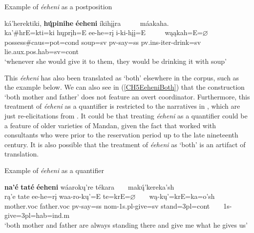 \begin{exe}
    \item\label{Ch5EeheniNoun} Example of \textit{éeheni} as a postposition

    \glll ká'herektiki, \textbf{hų́pinihe} \textbf{éeheni} íkihįįra ~ ~ ~ máakaha.\\
    ka'\#hrE=kti=ki hųprįh=E ee-he=rį i-ki-hįį=E ~ ~ ~ wąąkah=E=$\varnothing$\\
    \textnormal{possess}\#caus=pot=cond \textnormal{soup}=sv pv-\textnormal{say}=ss pv.ins-iter-\textnormal{drink}=sv ~ ~ ~ \textnormal{lie}.aux.pos.hab=sv=cont\\
    \glt `whenever she would give it to them, they would be drinking it with soup' \citep[207]{hollow1973a}
\end{exe}

This \textit{éeheni} has also been translated as `both' elsewhere in the corpus, such as the example below. We can also see in (\ref{CH5EeheniBoth}) that the construction `both mother and father' does not feature an overt coordinator. Furthermore, this treatment of \textit{éeheni} as a quantifier is restricted to the narratives in \citet{hollow1973b}, which are just re-elicitations from \citet{kennard1934}. It could be that treating \textit{éeheni} as a quantifier could be a feature of older varieties of Mandan, given the fact that  worked with consultants who were prior to the reservation period up to the late nineteenth century. It is also possible that the treatment of \textit{éeheni} as `both' is an artifact of translation.


\begin{exe}
    \item\label{CH5EeheniBoth} Example of \textit{éeheni} as a quantifier

    \glll \textbf{na'é} \textbf{taté} \textbf{éeheni} wáarokų're tékara ~ ~ makų́'kereka'sh\\
    rą'e tate ee-he=rį waa-ro-kų'=E te=krE=$\varnothing$ ~ ~ wą-kų'=krE=ka=o'sh\\
    \textnormal{mother}.voc \textnormal{father}.voc pv-\textnormal{say}=ss nom-1s.pl-\textnormal{give}=sv \textnormal{stand}=3pl=cont ~ ~ 1s-\textnormal{give}=3pl=hab=ind.m\\
    \glt `both mother and father are always standing there and give me what he gives us' \citep[128]{hollow1973b}
\end{exe}


